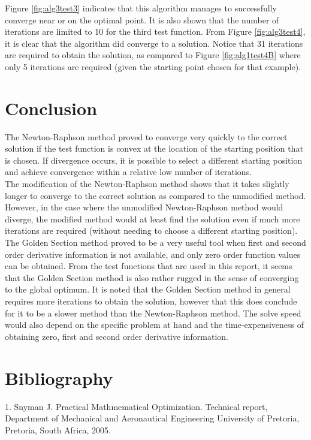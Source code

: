 \documentclass[a4paper,10pt]{article}
\begin{document}
Figure \ref{fig:alg3test3} indicates that this algorithm manages to successfully converge near or on the optimal point. It is also shown that the number of iterations are limited to 10 for the third test function. From Figure \ref{fig:alg3test4}, it is clear that the algorithm did converge to a solution. Notice that 31 iterations are required to obtain the solution, as compared to Figure \ref{fig:alg1test4B} where only 5 iterations are required (given the starting point chosen for that example).

\newpage
\section{Conclusion}
The Newton-Raphson method proved to converge very quickly to the correct solution if the test function is convex at the location of the starting position that is chosen. If divergence occurs, it is possible to select a different starting position and achieve convergence within a relative low number of iterations.\\[0.4cm]
The modification of the Newton-Raphson method shows that it takes slightly longer to converge to the correct solution as compared to the unmodified method. However, in the case where the unmodified Newton-Raphson method would diverge, the modified method would at least find the solution even if much more iterations are required (without needing to choose a different starting position).\\[0.4cm]
The Golden Section method proved to be a very useful tool when first and second order derivative information is not available, and only zero order function values can be obtained. From the test functions that are used in this report, it seems that the Golden Section method is also rather rugged in the sense of converging to the global optimum. It is noted that the Golden Section method in general requires more iterations to obtain the solution, however that this does conclude for it to be a slower method than the Newton-Raphson method. The solve speed would also depend on the specific problem at hand and the time-expensiveness of obtaining zero, first and second order derivative information.

\section{Bibliography}
1. Snyman J. Practical Mathmematical Optimization. Technical report, Department of Mechanical and Aeronautical Engineering University of Pretoria, Pretoria, South Africa, 2005. 
\end{document}
